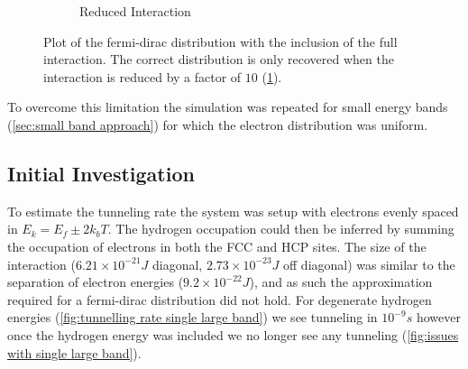 \begin{figure}[htbp]
\begin{subfigure}{0.45\linewidth}
        \caption{Reduced Interaction}\label{sub@fig:reduced interaction fermi-dirac}
    \end{subfigure}
    \caption{Plot of the fermi-dirac distribution
        with the inclusion of the full interaction. The
        correct distribution is only
        recovered when the interaction
        is reduced by a factor of \(10\)
        (\cref{sub@fig:reduced interaction fermi-dirac}).
    }\label{fig:incorrect fermi dirac}
\end{figure}
To overcome this limitation
the simulation was repeated
for small energy bands (\cref{sec:small band approach})
for which the electron distribution
was uniform.

\subsection{Initial Investigation}
To estimate the tunneling
rate the system was setup
with electrons evenly spaced
in \(E_k = E_f \pm 2k_b T\).
The hydrogen occupation
could then be inferred by
summing the occupation
of electrons in both the FCC and
HCP sites. The size of
the interaction (\(6.21\times{}10^{-21}J\) diagonal,
\(2.73\times{}10^{-23}J\) off diagonal) was
similar to the separation of electron energies
(\(9.2\times{}10^{-22}J\)),
and as such the approximation required
for a fermi-dirac distribution did not
hold. For degenerate hydrogen energies
(\cref{fig:tunnelling rate single large band})
we see tunneling in \(10^{-9}s\) however
once the hydrogen energy was included
we no longer see any tunneling
(\cref{fig:issues with single large band}).
